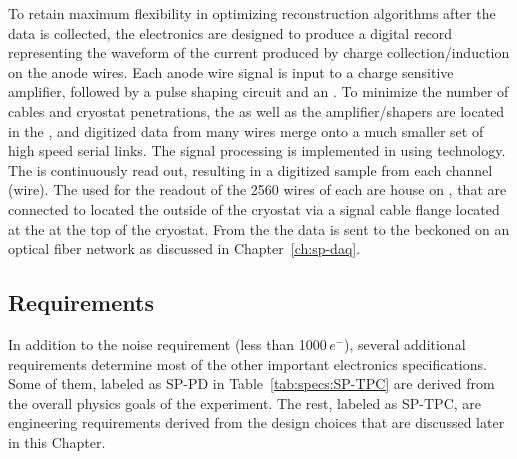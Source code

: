 To retain maximum flexibility in optimizing reconstruction algorithms after 
the  data is collected, the  electronics are designed 
to produce a digital record representing the waveform of the current produced 
by charge collection/induction on the anode wires.  Each anode wire signal is 
input to a charge sensitive amplifier, followed by a pulse shaping circuit and 
an .  To minimize the number of cables and cryostat penetrations, 
the  as well as the amplifier/shapers are located in the , 
and digitized data from many wires merge onto a much smaller set of high speed 
serial links. The  signal processing is implemented in 
using  technology.  The  is continuously 
read out, resulting in a digitized  sample from each  
channel (wire). The  used for the readout of the \num{2560}
wires of each  are house on , that are connected to
 located the outside of the cryostat via a  signal 
cable flange located at the  \fdth at the top of the cryostat.
From the  the data is sent to the  beckoned on
an optical fiber network as discussed in Chapter~\ref{ch:sp-daq}.

\subsection{Requirements}
\label{sec:fdsp-tpcelec-overview-requirements}

In addition to the noise requirement (less than \num{1000}\,$e^{-}$), several 
additional requirements determine most of the other important  
electronics specifications. Some of them, labeled as SP-PD in Table~\ref{tab:specs:SP-TPC}
are derived from the overall physics goals of the experiment. The rest, labeled
as SP-TPC, are engineering requirements derived from the design choices that
are discussed later in this Chapter.


